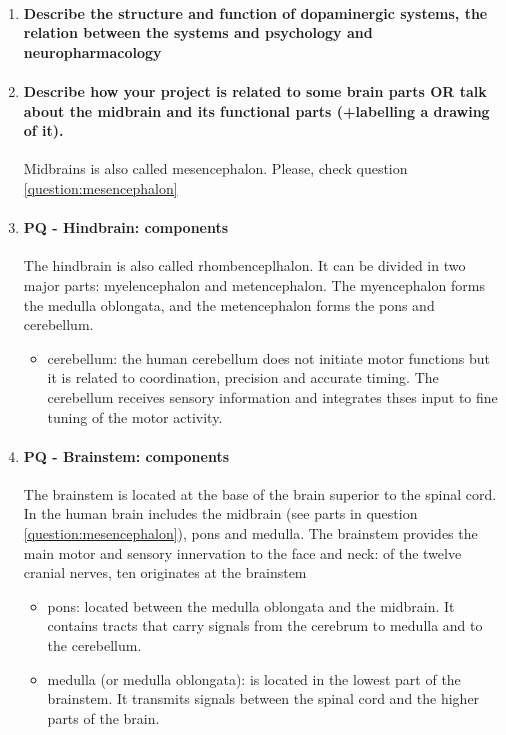 \documentclass[12pt,article,oneside,a4paper]{memoir}
\begin{document}
\begin{enumerate}
\item \paragraph{Describe the structure and function of dopaminergic systems, the relation between the systems and psychology and neuropharmacology}

\item \paragraph{Describe how your project is related to some brain parts OR talk about the midbrain and its functional parts (+labelling a drawing of it).}
Midbrains is also called mesencephalon. Please, check question \ref{question:mesencephalon}

\item \paragraph{PQ - Hindbrain: components}
The hindbrain is also called rhombenceplhalon. It can be divided in two major parts: myelencephalon and metencephalon. The myencephalon forms the medulla oblongata, and the metencephalon forms the pons and cerebellum.
\begin{itemize}
\item cerebellum: the human cerebellum does not initiate motor functions but it is related to coordination, precision and accurate timing. The cerebellum receives sensory information and integrates thses input to fine tuning of the motor activity.
\end{itemize}

\item \paragraph{PQ - Brainstem: components}
The brainstem is located at the base of the brain superior to the spinal cord. In the human brain includes the midbrain (see parts in question \ref{question:mesencephalon}), pons and medulla. The brainstem provides the main motor and sensory innervation to the face and neck: of the twelve cranial nerves, ten originates at the brainstem
\begin{itemize}
\item pons: located between the medulla oblongata and the midbrain. It contains tracts that carry signals from the cerebrum to medulla and to the cerebellum.
\item medulla (or medulla oblongata): is located in the lowest part of the brainstem. It transmits signals between the spinal cord and the higher parts of the brain.
\end{itemize}
\end{enumerate}
\end{document}
